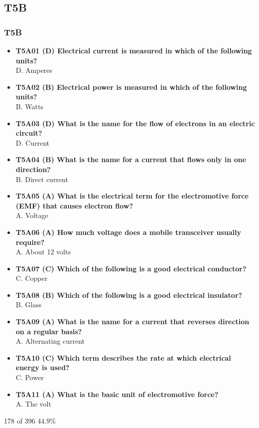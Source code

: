 \documentclass[10pt]{beamer}
\begin{document}
\subsection{T5B}
\begin{frame}
\frametitle{T5B}
\tiny
\begin{itemize}[<+->]
\item\textbf{T5A01 (D) Electrical current is measured in which of the following units?}\\D. Amperes
\item\textbf{T5A02 (B) Electrical power is measured in which of the following units?}\\B. Watts
\item\textbf{T5A03 (D) What is the name for the flow of electrons in an electric circuit?}\\D. Current
\item\textbf{T5A04 (B) What is the name for a current that flows only in one direction?}\\B. Direct current
\item\textbf{T5A05 (A) What is the electrical term for the electromotive force (EMF) that causes electron flow?}\\A. Voltage
\item\textbf{T5A06 (A) How much voltage does a mobile transceiver usually require?}\\A. About 12 volts
\item\textbf{T5A07 (C) Which of the following is a good electrical conductor?}\\C. Copper
\item\textbf{T5A08 (B) Which of the following is a good electrical insulator?}\\B. Glass
\item\textbf{T5A09 (A) What is the name for a current that reverses direction on a regular basis?}\\A. Alternating current
\item\textbf{T5A10 (C) Which term describes the rate at which electrical energy is used?}\\C. Power
\item\textbf{T5A11 (A) What is the basic unit of electromotive force?}\\A. The volt
\end{itemize}
\tiny 178 of 396  44.9\%
\end{frame}
\end{document}

